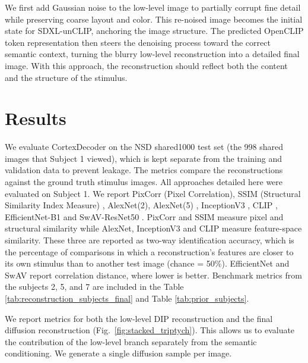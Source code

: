 \documentclass[letterpaper]{article} %
\begin{document}
We first add Gaussian noise to the low-level image to partially corrupt fine detail while preserving coarse layout and color. This re-noised image becomes the initial state for SDXL-unCLIP, anchoring the image structure. The predicted OpenCLIP token representation then steers the denoising process toward the correct semantic context, turning the blurry low-level reconstruction into a detailed final image. With this approach, the reconstruction should reflect both the content and the structure of the stimulus.



\section{Results}
\label{sec:results}




We evaluate CortexDecoder on the NSD shared1000 test set (the 998 shared images that Subject 1 viewed), which is kept separate from the training and validation data to prevent leakage. The metrics compare the reconstructions against the ground truth stimulus images. All approaches detailed here were evaluated on Subject 1. We report PixCorr (Pixel Correlation), SSIM (Structural Similarity Index Measure) \cite{1284395}, AlexNet(2), AlexNet(5) \cite{NIPS2012_c399862d}, InceptionV3 \cite{szegedy2015rethinkinginceptionarchitecturecomputer}, CLIP \cite{radford2021learningtransferablevisualmodels}, EfficientNet-B1 \cite{tan2020efficientnetrethinkingmodelscaling} and SwAV-ResNet50 \cite{caron2021unsupervisedlearningvisualfeatures}. PixCorr and SSIM measure pixel and structural similarity while AlexNet, InceptionV3 and CLIP measure feature-space similarity. These three are reported as two-way identification accuracy, which is the percentage of comparisons in which a reconstruction's features are closer to its own stimulus than to another test image (chance = 50\%). EfficientNet and SwAV report correlation distance, where lower is better. Benchmark metrics from the subjects 2, 5, and 7 are included in the Table \ref{tab:reconstruction_subjects_final} and Table \ref{tab:prior_subjects}.

We report metrics for both the low-level DIP reconstruction and the final diffusion reconstruction (Fig.~\ref{fig:stacked_triptych}). This allows us to evaluate the contribution of the low-level branch separately from the semantic conditioning. We generate a single diffusion sample per image.
\end{document}
